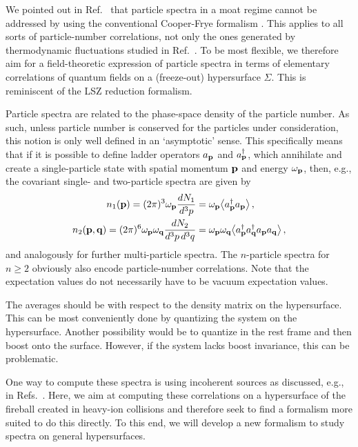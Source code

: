 \documentclass[reprint,superscriptaddress,english,preprintnumbers,amsmath,amssymb,aps,prx]{revtex4-2}
\begin{document}
We pointed out in Ref.\ \cite{Pisarski:2021qof} that particle spectra in a moat regime cannot be addressed by using the conventional Cooper-Frye formalism \cite{Cooper:1974mv}. This applies to all sorts of particle-number correlations, not only the ones generated by thermodynamic fluctuations studied in Ref.\ \cite{Pisarski:2021qof}. To be most flexible, we therefore aim for a field-theoretic expression of particle spectra in terms of elementary correlations of quantum fields on a (freeze-out) hypersurface $\Sigma$. This is reminiscent of the LSZ reduction formalism.

Particle spectra are related to the phase-space density of the particle number. As such, unless particle number is conserved for the particles under consideration, this notion is only well defined in an `asymptotic' sense. This specifically means that if it is possible to define ladder operators $a_{\bold p}$ and $a_{\bold p}^\dagger$, which annihilate and create a single-particle state with spatial momentum $\bold{p}$ and energy $\omega_{\bold{p}}$, then, e.g., the covariant single- and two-particle spectra are given by
\begin{align}\label{eq:spec}
\begin{split}
n_1(\bold{p}) = (2\pi)^3 \omega_\bold{p} \frac{dN_1}{d^3p} &= \omega_\bold{p} \big\langle a_{\bold p}^\dagger a_{\bold p}  \big\rangle\,,\\
n_2(\bold{p},\bold{q}) = (2\pi)^6 \omega_\bold{p}\omega_\bold{q} \frac{dN_2}{d^3p\,d^3q} &= \omega_\bold{p}\omega_\bold{q} \big\langle a_{\bold p}^\dagger a_{\bold q}^\dagger a_{\bold p}  a_{\bold q}\big\rangle\,,
\end{split}
\end{align}
and analogously for further multi-particle spectra. The $n$-particle spectra for $n\geq 2$ obviously also encode particle-number correlations.
Note that the expectation values do not necessarily have to be vacuum expectation values.

The averages should be with respect to the density matrix on the hypersurface. This can be most conveniently done by quantizing the system on the hypersurface. Another possibility would be to quantize in the rest frame and then boost onto the surface. However, if the system lacks boost invariance, this can be problematic.

One way to compute these spectra is using incoherent sources as discussed, e.g., in Refs.\ \cite{Heinz:1996bs, Weiner:1999th}. Here, we aim at computing these correlations on a hypersurface of the fireball created in heavy-ion collisions and therefore seek to find a formalism more suited to do this directly. To this end, we will develop a new formalism to study spectra on general hypersurfaces.
\end{document}
